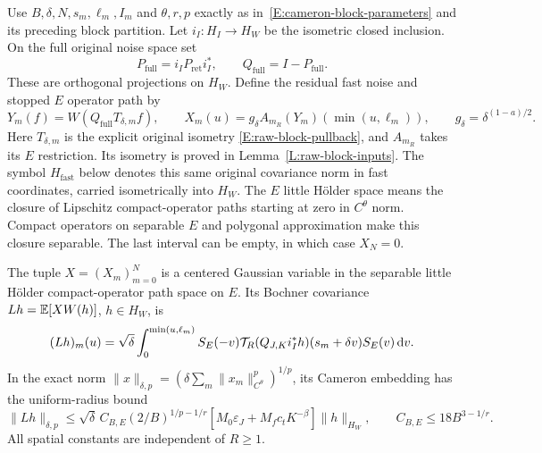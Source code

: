 Use $B,\delta,N,s_m,\ell_m,I_m$ and $\theta,r,p$ exactly as
in~\eqref{E:cameron-block-parameters} and its preceding block partition. Let
$i_I:H_I \to H_W$ be the isometric closed inclusion. On the full original noise
space set
\[
  P_{\mathrm{full}}=i_IP_{\mathrm{ret}}i_I^*,\qquad
  Q_{\mathrm{full}}=I-P_{\mathrm{full}} .
\]
These are orthogonal projections on $H_W$. Define the residual fast noise and
stopped $E$ operator path by
\begin{equation}\label{E:uniform-actual-residual}
  Y_m(f)=W(Q_{\mathrm{full}}T_{\delta,m}f),\qquad
  X_m(u)=g_\delta A_{m_R}(Y_m)(\min(u,\ell_m)),\qquad
  g_\delta=\delta^{(1-a)/2}.
\end{equation}
Here $T_{\delta,m}$ is the explicit original isometry
\eqref{E:raw-block-pullback}, and $A_{m_R}$ takes its $E$ restriction. Its
isometry is proved in Lemma~\ref{L:raw-block-inputs}. The symbol
$H_{\mathrm{fast}}$ below denotes this same original covariance norm in fast
coordinates, carried isometrically into $H_W$. The $E$ little H\"older space
means the closure of Lipschitz compact-operator paths starting at zero in
$C^\theta$ norm. Compact operators on separable $E$ and polygonal approximation
make this closure separable. The last interval can be empty, in which case $X_N
= 0$.

\begin{proposition}
  \label{P:uniform-actual-cameron}
  The tuple $X = (X_m)_{m=0}^N$ is a centered Gaussian variable in the separable
  little H\"older compact-operator path space on $E$. Its Bochner covariance $Lh
  = \mathbb{E}[XW(h)]$, $h \in H_W$, is
  \begin{equation}\label{E:uniform-actual-covariance}
    (Lh)_m(u)=\sqrt\delta\int_0^{\min(u,\ell_m)}
    S_E(-v)\mathcal{T}_R(Q_{J,K}i_I^*h)(s_m+\delta v)
    S_E(v)\,\mathrm{d} v .
  \end{equation}
  In the exact norm $\|x\|_{\delta,p} =
  (\delta\sum_m\|x_m\|_{C^\theta}^p)^{1/p}$, its Cameron embedding has the
  uniform-radius bound
  \begin{equation}\label{E:uniform-actual-cameron-bound}
    \|Lh\|_{\delta,p}
    \le\sqrt\delta\,C_{B,E}(2/B)^{1/p-1/r}
    [M_0\varepsilon_J+M_fc_tK^{-\beta}]\|h\|_{H_W},
    \qquad C_{B,E}\le18B^{3-1/r}.
  \end{equation}
  All spatial constants are independent of $R \ge 1$.
\end{proposition}

